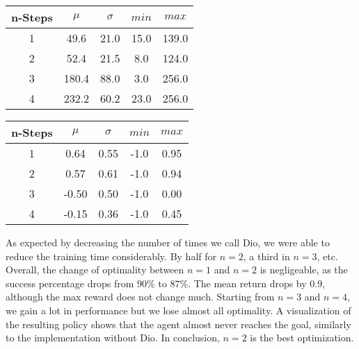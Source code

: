 \begin{table}[h!]
        \centering
        \begin{minipage}{.5\textwidth}
    \begin{tabular}[width=1\linewidth]{||c c c c c||} 
     \hline
     n-Steps & $\mu$ & $\sigma$ & $min$ & $max$ \\  [0.5ex] 
     \hline\hline
     1 & 49.6 & 21.0 & 15.0 & 139.0 \\ 
     \hline
     2 & 52.4 & 21.5 & 8.0 & 124.0 \\
     \hline
     3 & 180.4 & 88.0 & 3.0 & 256.0 \\
     \hline
     4 & 232.2 & 60.2 & 23.0 & 256.0 \\ [1ex] 
     \hline
    \end{tabular}
\end{minipage}%
\begin{minipage}{.5\textwidth}
    \centering
    \begin{tabular}[width=1\linewidth]{||c c c c c||} 
     \hline
     n-Steps & $\mu$ & $\sigma$ & $min$ & $max$ \\  [0.5ex] 
     \hline\hline
     1 & 0.64 & 0.55 & -1.0 & 0.95 \\ 
     \hline
     2 & 0.57 & 0.61 & -1.0 & 0.94 \\
     \hline
     3 & -0.50 & 0.50 & -1.0 & 0.00 \\
     \hline
     4 & -0.15 & 0.36 & -1.0 & 0.45 \\ [1ex] 
     \hline
    \end{tabular}
\end{minipage}%
\end{table}

As expected by decreasing the number of times we call Dio, we were able to reduce the 
training time considerably. By half for $n=2$, a third in $n=3$, etc. Overall, the change of optimality 
between $n=1$ and $n=2$ is negligeable, as the success percentage drops from $90\%$ to $87\%$. 
The mean return drops by $0.9$, although the max reward does not change much. 
Starting from $n=3$ and $n=4$, we gain a lot in performance but we lose almost all optimality. 
A visualization of the resulting policy shows that the agent almost never reaches the goal, similarly to the 
implementation without Dio. In conclusion, $n=2$ is the best optimization. 


